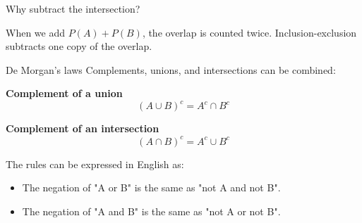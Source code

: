 \documentclass[12pt]{beamer}
\newcommand{\vocab}[1]{\textcolor{AggieMaroon}{\textbf{#1}}}
\begin{document}
\begin{frame}{}
\begin{block}{Why subtract the intersection?}
\vspace{0.4cm}
\centering
{}

\vspace{0.4cm}
When we add $P(A)+P(B)$, the overlap is counted twice. Inclusion-exclusion subtracts one copy of the overlap.
\end{block}
\end{frame}

\begin{frame}{}
\begin{block}{De Morgan's laws}
Complements, unions, and intersections can be combined:

\vspace{0.2cm}
\vocab{Complement of a union}
\[
(A\cup B)^c = A^c \cap B^c
\]

\vspace{0.2cm}
\vocab{Complement of an intersection}
\[
(A\cap B)^c = A^c \cup B^c
\]
\end{block}

The rules can be expressed in English as:
\begin{itemize}
  \item The negation of "A or B" is the same as "not A and not B".
  \item The negation of "A and B" is the same as "not A or not B".
\end{itemize}
\end{frame}
\end{document}
